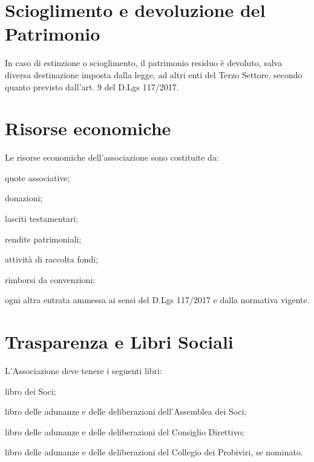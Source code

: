 \documentclass[legalpaper, 11pt]{exam}
\let\tempone\enumerate
\let\temptwo\endenumerate
\renewenvironment{enumerate}{\tempone\addtolength{\itemsep}{-0.45\baselineskip}}{\temptwo}
\begin{document}
{\begin{enumerate}
\end{enumerate}

\section{Scioglimento e devoluzione del Patrimonio}
\begin{enumerate}
 \item In caso di estinzione o scioglimento, il patrimonio residuo è devoluto, salva diversa destinazione imposta dalla legge, ad altri enti del Terzo Settore, secondo quanto previsto dall’art. 9 del D.Lgs 117/2017.
\end{enumerate}

\section{Risorse economiche}
\begin{enumerate}
 \item Le risorse economiche dell'associazione sono costituite da:
 \vspace{-5pt}
 \begin{enumerate}
  \item quote associative;
  \item donazioni;
  \item lasciti testamentari;
  \item rendite patrimoniali;
  \item attività di raccolta fondi;
  \item rimborsi da convenzioni;
  \item ogni altra entrata ammessa ai sensi del D.Lgs 117/2017 e dalla normativa vigente.
 \end{enumerate}
\end{enumerate}


\section{Trasparenza e Libri Sociali}
\begin{enumerate}
 \item L'Associazione deve tenere i seguenti libri: 
 \vspace{-5pt}
 \begin{enumerate}
  \item libro dei Soci;
  \item libro delle adunanze e delle deliberazioni dell'Assemblea dei Soci;
  \item libro delle adunanze e delle deliberazioni del Consiglio Direttivo;
  \item libro delle adunanze e delle deliberazioni del Collegio dei Probiviri, se nominato.
 \end{enumerate}
 

\end{enumerate}}
\end{document}
